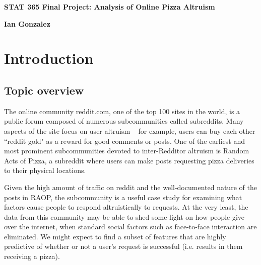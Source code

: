 \documentclass{article}\usepackage[]{graphicx}\usepackage[]{color}
\begin{document}
\begin{center}
{\bf {\Large STAT 365 Final Project: Analysis of Online Pizza Altruism}}\\


\vspace{3mm}

{\bf Ian Gonzalez}
\end{center}










\section{Introduction}

\subsection{Topic overview}

The online community reddit.com, one of the top 100 sites in the world, is a public forum composed of numerous subcommunities called subreddits. Many aspects of the site focus on user altruism -- for example, users can buy each other ``reddit gold" as a reward for good comments or posts. One of the earliest and most prominent subcommunities devoted to inter-Redditor altruism is Random Acts of Pizza, a subreddit where users can make posts requesting pizza deliveries to their physical locations.

Given the high amount of traffic on reddit and the well-documented nature of the posts in RAOP, the subcommunity is a useful case study for examining what factors cause people to respond altruistically to requests. At the very least, the data from this community may be able to shed some light on how people give over the internet, when standard social factors such as face-to-face interaction are eliminated. We might expect to find a subset of features that are highly predictive of whether or not a user's request is successful (i.e. results in them receiving a pizza).
\end{document}
